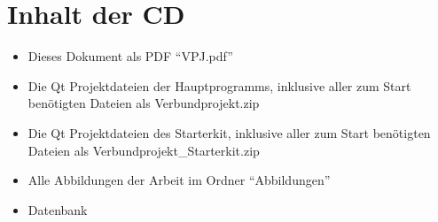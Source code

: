 
\chapter{Inhalt der CD}
\begin{itemize}
    \item Dieses Dokument als PDF "`VPJ.pdf"' \\

    \item Die Qt Projektdateien der Hauptprogramms, inklusive aller zum Start benötigten Dateien als Verbundprojekt.zip \\

    \item Die Qt Projektdateien des Starterkit, inklusive aller zum Start benötigten Dateien als Verbundprojekt\_Starterkit.zip \\
		
    \item Alle Abbildungen der Arbeit im Ordner "`Abbildungen"' \\
		
		\item Datenbank


\end{itemize}

